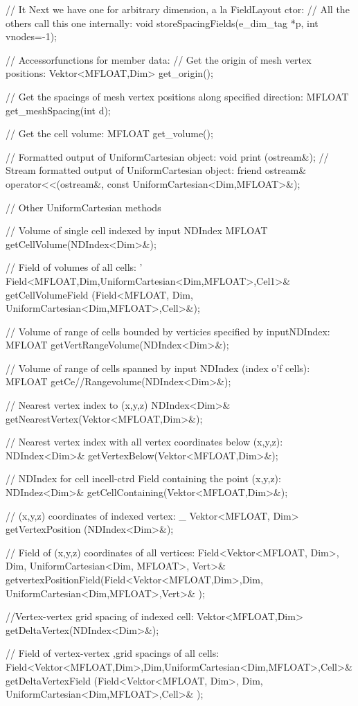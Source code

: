 \begin{smallcode}
{// It Next we have one for arbitrary dimension, a la FieldLayout ctor: 
// All the others call this one internally: 
void storeSpacingFields(e_dim_tag *p, int vnodes=-1); 

// Accessorfunctions for member data: 
// Get the origin of mesh vertex positions: 
Vektor<MFLOAT,Dim> get_origin(); 

// Get the spacings of mesh vertex positions along specified direction: 
MFLOAT get_meshSpacing(int d); 

// Get the cell volume: 
MFLOAT get_volume(); 

// Formatted output of UniformCartesian object: 
void print (ostream&);
// Stream formatted output of UniformCartesian object: 
friend ostream& operator<<(ostream&, const UniformCartesian<Dim,MFLOAT>&);

// Other UniformCartesian methods

// Volume of single cell indexed by input NDIndex
MFLOAT getCellVolume(NDIndex<Dim>&);

// Field of volumes of all cells: ' Field<MFLOAT,Dim,UniformCartesian<Dim,MFLOAT>,Cel1>& 
getCellVolumeField (Field<MFLOAT, Dim, UniformCartesian<Dim,MFLOAT>,Cell>&); 

// Volume of range of cells bounded by verticies specified by inputNDIndex: 
MFLOAT getVertRangeVolume(NDIndex<Dim>&); 

// Volume of range of cells spanned by input NDIndex (index o'f cells): 
MFLOAT getCe//Rangevolume(NDIndex<Dim>&); 

// Nearest vertex index to (x,y,z)
NDIndex<Dim>& getNearestVertex(Vektor<MFLOAT,Dim>&); 

// Nearest vertex index with all vertex coordinates below (x,y,z): 
NDIndex<Dim>& getVertexBelow(Vektor<MFLOAT,Dim>&);

// NDIndex for cell incell-ctrd Field containing the point (x,y,z): 
NDIndez<Dim>& getCellContaining(Vektor<MFLOAT,Dim>&);
 
// (x,y,z) coordinates of indexed vertex: 	_ 
Vektor<MFLOAT, Dim> getVertexPosition (NDIndex<Dim>&); 
 
// Field of (x,y,z) coordinates of all vertices: 
Field<Vektor<MFLOAT, Dim>, Dim, UniformCartesian<Dim, MFLOAT>, Vert>& 
getvertexPositionField(Field<Vektor<MFLOAT,Dim>,Dim, UniformCartesian<Dim,MFLOAT>,Vert>& ); 
 
//Vertex-vertex grid spacing of indexed cell:
Vektor<MFLOAT,Dim> getDeltaVertex(NDIndex<Dim>&); 

// Field of vertex-vertex ,grid spacings of all cells: 
Field<Vektor<MFLOAT,Dim>,Dim,UniformCartesian<Dim,MFLOAT>,Cell>& 
getDeltaVertexField (Field<Vektor<MFLOAT, Dim>, Dim, UniformCartesian<Dim,MFLOAT>,Cell>& ); 

}
\end{smallcode}
